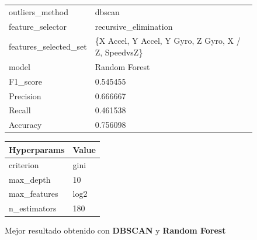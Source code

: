 \begin{appendices}
		\begin{figure}[htb]
			\centering
			\begin{tabular}{ll}
				\toprule
					  outliers\_method &                                             dbscan \\
					 feature\_selector &                              recursive\_elimination \\
				features\_selected\_set & \{X Accel, Y Accel, Y Gyro, Z Gyro, X / Z, SpeedvsZ\}\\
								model &                                      Random Forest \\
							 F1\_score &                                           0.545455 \\
							Precision &                                           0.666667 \\
							   Recall &                                           0.461538 \\
							 Accuracy &                                           0.756098 \\
				\bottomrule
			\end{tabular}
			\newline
			\newline

			\begin{tabular}{ll}
				\toprule
				 Hyperparams & Value \\
				\midrule
				   criterion &  gini \\
				   max\_depth &    10 \\
				max\_features &  log2 \\
				n\_estimators &   180 \\
				\bottomrule
			\end{tabular}
			\caption{Mejor resultado obtenido con \textbf{DBSCAN} y \textbf{Random Forest}}
			\label{table:35}

		\end{figure}


\end{appendices}
